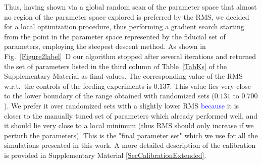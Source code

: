 \documentclass[oneside, 10pt, a4paper, twocolumn]{article}
\begin{document}
Thus, having shown via a global random scan of the parameter space that almost no region of the parameter space explored is preferred by the RMS, we decided for a local optimization procedure, thus performing a gradient search starting from the point in the parameter space represented by the fiducial set of parameters, 
employing the steepest descent method. 
As shown in Fig.~\ref{Figure2label}~D our algorithm stopped after several iterations and returned the set of parameters listed in the third column of Table~\ref{TabKs} of the Supplementary Material as final values. The corresponding value of the RMS w.r.t.~the controls of the feeding experiments is $0.137$. This value lies very close to the lower boundary of the range obtained with randomized sets ($0.131$ to $0.700$). We prefer it over randomized sets with a slightly lower RMS \textcolor{blue}{because} it is closer to the manually tuned set of parameters which already performed well, and it should lie very close to a local minimum (thus RMS should only increase if we perturb the parameters).
This is the "final parameter set" which we use for all the simulations
presented in this work. %
A more detailed description of the calibration 
is provided in Supplementary Material \ref{SecCalibrationExtended}. 

\end{document}
